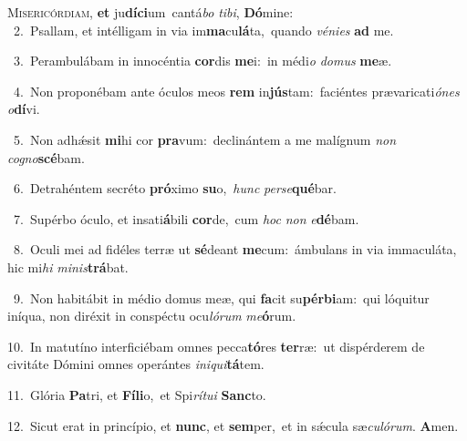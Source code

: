 \lettrine{\initial\textcolor{\initialcolor}{M}}{isericórdiam,} \textbf{et} ju\-\textbf{dí}\-\textbf{ci}um~\star cantá\textit{bo} \textit{ti}\-\textit{bi}, \textbf{Dó}\-mine:\\
{\numbfont\textcolor{\numbcolor}{~2.}}~Psallam, et intélligam in via im\-\textbf{ma}\-cu\-\textbf{lá}\-ta,~\star quando \textit{vé}\-\textit{ni}\textit{es} \textbf{ad} me.\par
{\numbfont\textcolor{\numbcolor}{~3.}}~Perambulábam in innocéntia \textbf{cor}\-dis \textbf{me}\-i:~\star in médi\textit{o} \textit{do}\-\textit{mus} \textbf{me}\-æ.\par
{\numbfont\textcolor{\numbcolor}{~4.}}~Non proponébam ante óculos meos \textbf{rem} in\-\textbf{jús}\-tam:~\star faciéntes prævaricati\-\textit{ó}\-\textit{nes} \textit{o}\-\textbf{dí}vi.\par
{\numbfont\textcolor{\numbcolor}{~5.}}~Non adhǽsit \textbf{mi}\-hi cor \textbf{pra}\-vum:~\star declinántem a me malígnum \textit{non} \textit{co}\-\textit{gno}\textbf{scé}bam.\par
{\numbfont\textcolor{\numbcolor}{~6.}}~Detrahéntem secréto \textbf{pró}\-ximo \textbf{su}\-o,~\star \textit{hunc} \textit{per}\-\textit{se}\textbf{qué}bar.\par
{\numbfont\textcolor{\numbcolor}{~7.}}~Supérbo óculo, et insati\-\textbf{á}\-bili \textbf{cor}\-de,~\star cum \textit{hoc} \textit{non} \textit{e}\-\textbf{dé}bam.\par
{\numbfont\textcolor{\numbcolor}{~8.}}~Oculi mei ad fidéles terræ ut \textbf{sé}\-deant \textbf{me}\-cum:~\star ámbulans in via immaculáta, hic mi\textit{hi} \textit{mi}\-\textit{nis}\textbf{trá}bat.\par
{\numbfont\textcolor{\numbcolor}{~9.}}~Non habitábit in médio domus meæ, qui \textbf{fa}\-cit su\-\textbf{pér}\-\textbf{bi}am:~\star qui lóquitur iníqua, non diréxit in conspéctu ocu\-\textit{ló}\-\textit{rum} \textit{me}\-\textbf{ó}rum.\par
{\numbfont\textcolor{\numbcolor}{10.}}~In matutíno interficiébam omnes pecca\-\textbf{tó}\-res \textbf{ter}\-ræ:~\star ut dispérderem de civitáte Dómini omnes operántes \textit{in}\-\textit{i}\textit{qui}\textbf{tá}tem.\par
{\numbfont\textcolor{\numbcolor}{11.}}~Glória \textbf{Pa}\-tri, et \textbf{Fí}\-\textbf{li}o,~\star et Spi\-\textit{rí}\-\textit{tu}\textit{i} \textbf{Sanc}\-to.\par
{\numbfont\textcolor{\numbcolor}{12.}}~Sicut erat in princípio, et \textbf{nunc}\-, et \textbf{sem}\-per,~\star et in sǽcula sæ\-\textit{cu}\-\textit{ló}\textit{rum}. \textbf{A}\-men.\par
